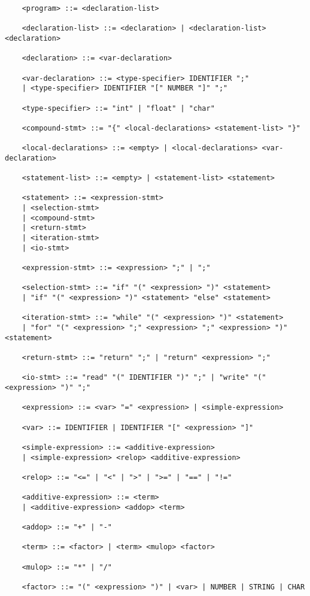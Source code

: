 \documentclass[10pt, a4paper]{article}
\begin{document}
\begin{verbatim}
    <program> ::= <declaration-list>

    <declaration-list> ::= <declaration> | <declaration-list> <declaration>

    <declaration> ::= <var-declaration> 

    <var-declaration> ::= <type-specifier> IDENTIFIER ";" 
    | <type-specifier> IDENTIFIER "[" NUMBER "]" ";"

    <type-specifier> ::= "int" | "float" | "char"

    <compound-stmt> ::= "{" <local-declarations> <statement-list> "}"

    <local-declarations> ::= <empty> | <local-declarations> <var-declaration>

    <statement-list> ::= <empty> | <statement-list> <statement>

    <statement> ::= <expression-stmt> 
    | <selection-stmt> 
    | <compound-stmt> 
    | <return-stmt> 
    | <iteration-stmt> 
    | <io-stmt>

    <expression-stmt> ::= <expression> ";" | ";"

    <selection-stmt> ::= "if" "(" <expression> ")" <statement> 
    | "if" "(" <expression> ")" <statement> "else" <statement>

    <iteration-stmt> ::= "while" "(" <expression> ")" <statement>
    | "for" "(" <expression> ";" <expression> ";" <expression> ")" <statement>

    <return-stmt> ::= "return" ";" | "return" <expression> ";"

    <io-stmt> ::= "read" "(" IDENTIFIER ")" ";" | "write" "(" <expression> ")" ";"

    <expression> ::= <var> "=" <expression> | <simple-expression>

    <var> ::= IDENTIFIER | IDENTIFIER "[" <expression> "]"

    <simple-expression> ::= <additive-expression> 
    | <simple-expression> <relop> <additive-expression>

    <relop> ::= "<=" | "<" | ">" | ">=" | "==" | "!="

    <additive-expression> ::= <term> 
    | <additive-expression> <addop> <term>

    <addop> ::= "+" | "-"

    <term> ::= <factor> | <term> <mulop> <factor>

    <mulop> ::= "*" | "/"

    <factor> ::= "(" <expression> ")" | <var> | NUMBER | STRING | CHAR

\end{verbatim}
\end{document}
